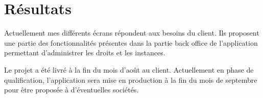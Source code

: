 \section{Résultats}

Actuellement mes différents écrans répondent aux besoins du client.
Ils proposent une partie des fonctionnalités présentes dans la partie back office de l'application permettant d'administrer les droits et les instances.

Le projet a été livré à la fin du mois d'août au client.
Actuellement en phase de qualification, l'application sera mise en production à la fin du mois de septembre pour être proposée à d'éventuelles sociétés.